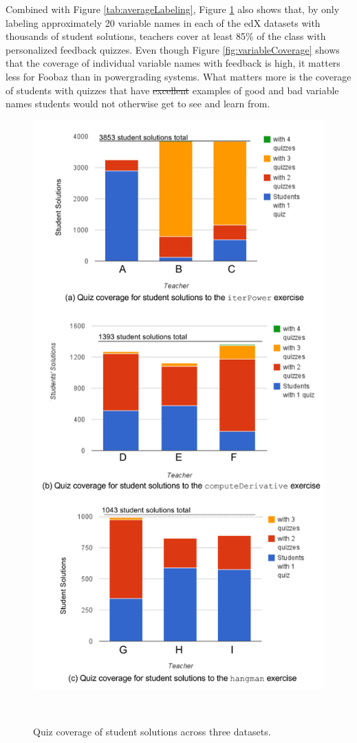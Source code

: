 \documentclass[12pt,twoside]{mitthesis}
\providecommand{\DIFdeltex}[1]{{\protect\color{red}\sout{#1}}}                      %
\providecommand{\DIFdelbegin}{} %
\providecommand{\DIFdelend}{} %
\providecommand{\DIFaddbeginFL}{} %
\providecommand{\DIFaddendFL}{} %
\providecommand{\DIFdelbeginFL}{} %
\providecommand{\DIFdelendFL}{} %
\providecommand{\DIFdel}[1]{\texorpdfstring{\DIFdeltex{#1}}{}} %
\begin{document}
Combined with Figure \ref{tab:averageLabeling}, Figure \ref{fig:comboquizcoverage} also shows that, by only labeling approximately 20 variable names in each of the edX datasets with thousands of student solutions, teachers cover at least 85\% of the class with personalized feedback quizzes. Even though Figure \ref{fig:variableCoverage} shows that the coverage of individual variable names with feedback is high, it matters less for Foobaz than in powergrading systems. What matters more is the coverage of students with quizzes that have \DIFdelbegin \DIFdel{excellent }\DIFdelend examples of good and bad variable names students would not otherwise get to see and learn from.

\begin{figure}
\begin{minipage}{1\columnwidth}
\centering
\DIFdelbeginFL %
\DIFdelendFL \DIFaddbeginFL \includegraphics[width=0.7\columnwidth]{Body/figures/foobaz/ComboQuizCoverageFigure2.png}
\DIFaddendFL \caption{Quiz coverage of student solutions across three datasets.}~\label{fig:comboquizcoverage}
\DIFdelbeginFL %
\DIFdelendFL 

\DIFaddbeginFL \end{minipage}
\end{figure}
\end{document}
